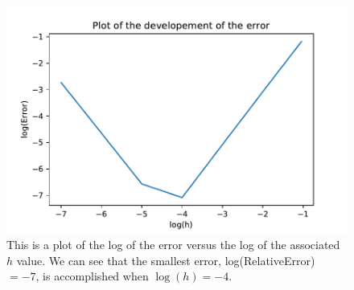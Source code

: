 \begin{figure}[H]
\includegraphics[width=\linewidth]{figures/ErrorDevelopement.pdf}\caption{This is a plot of the log of the error versus the log of the associated $h$ value. We can see that the smallest error, log(RelativeError) $= -7$, is accomplished when $\log(h) = -4$.}\label{fig:error_development}
\end{figure}
